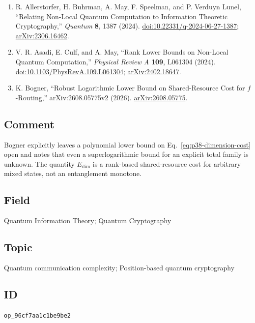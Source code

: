 \begin{enumerate}[label={},leftmargin=4.8em,labelsep=0.5em]
  \footnotesize
  \item[\textup{[ABM+24]}]\label{ref:p38-allerstorfer}
  R. Allerstorfer, H. Buhrman, A. May, F. Speelman, and P. Verduyn Lunel,
  ``Relating Non-Local Quantum Computation to Information Theoretic
  Cryptography,'' \emph{Quantum} \textbf{8}, 1387 (2024).
  \href{https://doi.org/10.22331/q-2024-06-27-1387}{doi:10.22331/q-2024-06-27-1387};
  \href{https://arxiv.org/abs/2306.16462}{arXiv:2306.16462}.

  \item[\textup{[ACM24]}]\label{ref:p38-asadi}
  V. R. Asadi, E. Culf, and A. May, ``Rank Lower Bounds on Non-Local Quantum
  Computation,'' \emph{Physical Review A} \textbf{109}, L061304 (2024).
  \href{https://doi.org/10.1103/PhysRevA.109.L061304}{doi:10.1103/PhysRevA.109.L061304};
  \href{https://arxiv.org/abs/2402.18647}{arXiv:2402.18647}.

  \item[\textup{[Bog26]}]\label{ref:p38-bogner}
  K. Bogner, ``Robust Logarithmic Lower Bound on Shared-Resource Cost for
  $f$-Routing,'' arXiv:2608.05775v2 (2026).\newline
  \href{https://arxiv.org/abs/2608.05775}{arXiv:2608.05775}.
\end{enumerate}

\subsection*{Comment}

Bogner explicitly leaves a polynomial lower bound on
Eq.~\eqref{eq:p38-dimension-cost} open and notes that even a superlogarithmic
bound for an explicit total family is unknown.  The quantity
$E_{\mathrm{dim}}$ is a rank-based shared-resource cost for arbitrary mixed
states, not an entanglement monotone.

\subsection*{Field}

Quantum Information Theory; Quantum Cryptography

\subsection*{Topic}

Quantum communication complexity; Position-based quantum cryptography

\subsection*{ID}

\texttt{op\_96cf7aa1c1be9be2}
